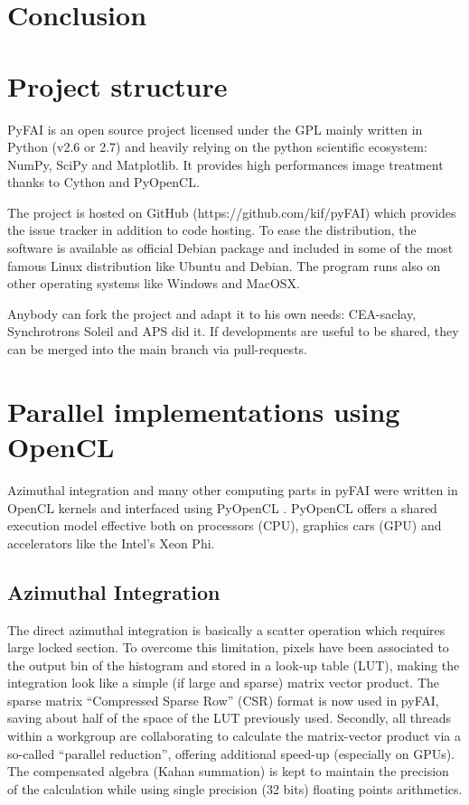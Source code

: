 \documentclass[preprint]{iucr}
\begin{document}
\section{Conclusion}







\appendix
\section{Project structure}
PyFAI is an open source project licensed under the GPL mainly written in Python (v2.6 or 2.7)
and heavily relying on the python scientific ecosystem: NumPy, SciPy and Matplotlib.
It provides high performances image treatment thanks to Cython and PyOpenCL.

The project is hosted on GitHub (https://github.com/kif/pyFAI) which provides
the issue tracker in addition to code hosting.
To ease the distribution, the
software is available as official Debian package and included in some of the
most famous Linux distribution like Ubuntu and Debian.
The program runs also on other operating systems like Windows and MacOSX.

Anybody can fork the project and adapt it to his own needs: CEA-saclay,
Synchrotrons Soleil and APS did it. If developments are useful to be shared,
they can be merged into the main branch via pull-requests.

\section{Parallel implementations using OpenCL}
Azimuthal integration and many other computing parts in pyFAI were written in
OpenCL kernels and interfaced using PyOpenCL \cite{pyopencl}. PyOpenCL offers a
shared execution model effective both on processors (CPU), graphics cars (GPU)
and accelerators like the Intel's Xeon Phi.

\subsection{Azimuthal Integration}
The direct azimuthal integration is basically a scatter operation which
requires large locked section.
To overcome this limitation, pixels have been
associated to the output bin of the histogram and stored in a look-up
table (LUT), making the integration look like a simple (if large and sparse)
matrix vector product.
The sparse matrix ``Compressed Sparse Row'' (CSR) format is now used in pyFAI,
saving about half of the space of the LUT previously used.
Secondly, all threads within a workgroup are collaborating to calculate the
matrix-vector product via a so-called ``parallel reduction'', offering
additional speed-up (especially on GPUs).
The compensated algebra (Kahan summation) is kept to maintain the precision
of the calculation while using single precision (32 bits) floating points
arithmetics. 
\end{document}
